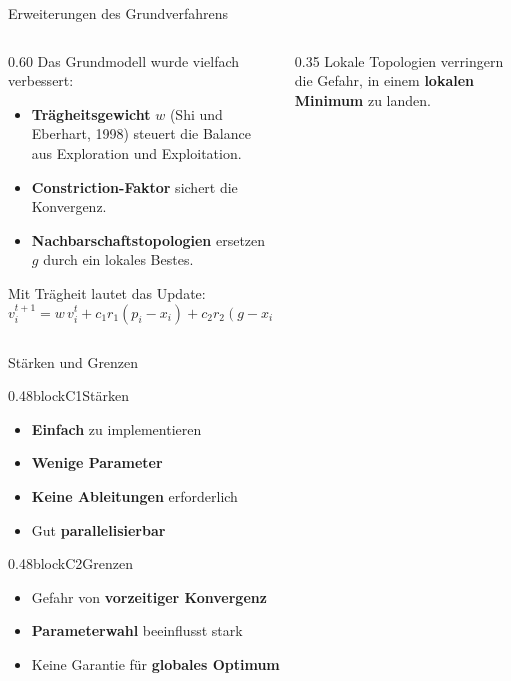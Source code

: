 \begin{frame}{Erweiterungen des Grundverfahrens}
\begin{columns}
\begin{column}{0.60\textwidth}
Das Grundmodell wurde vielfach verbessert:
\begin{itemize}
\item \textbf{Trägheitsgewicht} $w$ (Shi und Eberhart, 1998) steuert die Balance aus Exploration und Exploitation.
\item \textbf{Constriction-Faktor} sichert die Konvergenz.
\item \textbf{Nachbarschaftstopologien} ersetzen $g$ durch ein lokales Bestes.
\end{itemize}
Mit Trägheit lautet das Update:
\[
v_i^{t+1} = w\, v_i^{t} + c_1 r_1 (p_i - x_i) + c_2 r_2 (g - x_i)
\]
\end{column}
\begin{column}{0.35\textwidth}
Lokale Topologien verringern die Gefahr, in einem \textbf{lokalen Minimum} zu landen.
\end{column}
\end{columns}
\end{frame}


\begin{frame}{Stärken und Grenzen}
\begin{blockrow}

\begin{blockcol}{0.48\textwidth}{blockC1}{Stärken}
\begin{itemize}
\item \textbf{Einfach} zu implementieren
\item \textbf{Wenige Parameter}
\item \textbf{Keine Ableitungen} erforderlich
\item Gut \textbf{parallelisierbar}
\end{itemize}
\end{blockcol}

\begin{blockcol}{0.48\textwidth}{blockC2}{Grenzen}
\begin{itemize}
\item Gefahr von \textbf{vorzeitiger Konvergenz}
\item \textbf{Parameterwahl} beeinflusst stark
\item Keine Garantie für \textbf{globales Optimum}
\end{itemize}
\end{blockcol}

\end{blockrow}
\end{frame}

